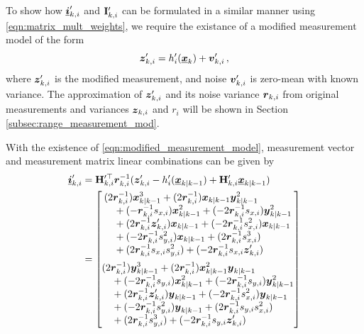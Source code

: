 \documentclass[10pt,journal,compsoc]{IEEEtran}
\theoremstyle{definition}
\theoremstyle{definition}
\theoremstyle{remark}
\begin{document}
To show how ${\boldsymbol{\underline{i}}}'_{k,i}$ and ${{\mathbf{I}}}'_{k,i}$ can be formulated in a similar manner using \eqref{eqn:matrix_mult_weights}, we require the existance of a modified measurement model of the form
\begin{equation}
    \rv{z}'_{k,i} = h'_i(\rvec{x}_k)+\rv{v}'_{k,i}\,, \label{eqn:modified_measurement_model}
\end{equation}
where ${\boldsymbol{z}}'_{k,i}$ is the modified measurement, and noise ${\boldsymbol{v}}'_{k,i}$ is zero-mean with known variance. The approximation of ${\boldsymbol{z}}'_{k,i}$ and its noise variance ${\boldsymbol{r}}_{k,i}$ from original measurements and variances ${\boldsymbol{z}}_{k,i}$ and $r_i$ will be shown in Section \ref{subsec:range_measurement_mod}. 

With the existence of \eqref{eqn:modified_measurement_model}, measurement vector and measurement matrix linear combinations can be given by
\begin{equation}
    \begin{split}
        \rvec{i}'_{k,i} &= \mat{H}_{k,i}^{\prime\top} \rv{r}_{k,i}^{-1}(\rv{z}'_{k,i} - h'_i(\rvec{x}_{k|k-1}) + \mat{H}'_{k,i}\rvec{x}_{k|k-1}) \\
        &= 
        \begin{bmatrix}
            \begin{split}
                &(2\rv{r}_{k,i}^{-1})\rv{x}_{k|k-1}^3 + (2\rv{r}_{k,i}^{-1})\rv{x}_{k|k-1}\rv{y}_{k|k-1}^2 \\
                &\quad+ (-\rv{r}_{k,i}^{-1}s_{x,i})\rv{x}_{k|k-1}^2 + (-2\rv{r}_{k,i}^{-1}s_{x,i})\rv{y}_{k|k-1}^2 \\
                &\quad+ (2\rv{r}_{k,i}^{-1}\rv{z}'_{k,i})\rv{x}_{k|k-1} + (-2\rv{r}_{k,i}^{-1}s_{x,i}^2)\rv{x}_{k|k-1}\\
                &\quad+ (-2\rv{r}_{k,i}^{-1}s_{y,i}^2)\rv{x}_{k|k-1} + (2\rv{r}_{k,i}^{-1}s_{x,i}^3) \\
                &\quad+ (2\rv{r}_{k,i}^{-1}s_{x,i}s_{y,i}^2) + (-2\rv{r}_{k,i}^{-1}s_{x,i} \rv{z}'_{k,i})
            \end{split}
            \vspace{5pt}\\
            \begin{split}
                &(2\rv{r}_{k,i}^{-1})\rv{y}_{k|k-1}^3 + (2\rv{r}_{k,i}^{-1})\rv{x}_{k|k-1}^2\rv{y}_{k|k-1} \\
                &\quad+ (-2\rv{r}_{k,i}^{-1}s_{y,i})\rv{x}_{k|k-1}^2 + (-2\rv{r}_{k,i}^{-1}s_{y,i})\rv{y}_{k|k-1}^2 \\
                &\quad+ (2\rv{r}_{k,i}^{-1}\rv{z}'_{k,i})\rv{y}_{k|k-1} + (-2\rv{r}_{k,i}^{-1}s_{x,i}^2)\rv{y}_{k|k-1} \\
                &\quad+ (-2\rv{r}_{k,i}^{-1}s_{y,i}^2)\rv{y}_{k|k-1} + (2\rv{r}_{k,i}^{-1}s_{y,i}s_{x,i}^2) \\
                &\quad+ (2\rv{r}_{k,i}^{-1}s_{y,i}^3) + (-2\rv{r}_{k,i}^{-1}s_{y,i}\rv{z}'_{k,i})
            \end{split}
        \end{bmatrix}
    \end{split} \label{eqn:hrz_linear_comb}
\end{equation}
\end{document}

